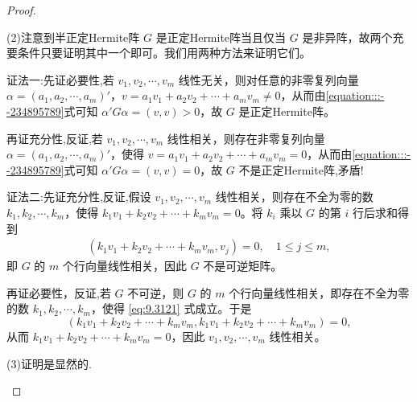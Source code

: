 \documentclass[../../main.tex]{subfiles}%
\begin{document}
\begin{proof}
\begin{enumerate}
(2)注意到半正定Hermite阵 $G$ 是正定Hermite阵当且仅当 $G$ 是非异阵，故两个充要条件只要证明其中一个即可。我们用两种方法来证明它们。

{\color{blue}证法一:}先证必要性,若 $v_1,v_2,\cdots,v_m$ 线性无关，则对任意的非零复列向量 $\alpha=(a_1,a_2,\cdots,a_m)'$，$v = a_1v_1 + a_2v_2 + \cdots + a_mv_m\neq0$，从而由\eqref{equation:::--234895789}式可知 $\alpha'G\alpha=(v,v)>0$，故 $G$ 是正定Hermite阵。

再证充分性,反证,若 $v_1,v_2,\cdots,v_m$ 线性相关，则存在非零复列向量 $\alpha=(a_1,a_2,\cdots,a_m)'$，使得 $v = a_1v_1 + a_2v_2 + \cdots + a_mv_m = 0$，从而由\eqref{equation:::--234895789}式可知 $\alpha'G\alpha=(v,v)=0$，故 $G$ 不是正定Hermite阵,矛盾!

{\color{blue}证法二:}先证充分性,反证,假设 $v_1,v_2,\cdots,v_m$ 线性相关，则存在不全为零的数 $k_1,k_2,\cdots,k_m$，使得 $k_1v_1 + k_2v_2 + \cdots + k_mv_m = 0$。将 $k_i$ 乘以 $G$ 的第 $i$ 行后求和得到
\begin{align}
(k_1v_1 + k_2v_2 + \cdots + k_mv_m,v_j)=0,\quad 1\leqslant  j\leqslant  m,\label{eq:9.3121}
\end{align}
即 $G$ 的 $m$ 个行向量线性相关，因此 $G$ 不是可逆矩阵。

再证必要性，反证,若 $G$ 不可逆，则 $G$ 的 $m$ 个行向量线性相关，即存在不全为零的数 $k_1,k_2,\cdots,k_m$，使得 \eqref{eq:9.3121} 式成立。于是
\[
(k_1v_1 + k_2v_2 + \cdots + k_mv_m,k_1v_1 + k_2v_2 + \cdots + k_mv_m)=0,
\]
从而 $k_1v_1 + k_2v_2 + \cdots + k_mv_m = 0$，因此 $v_1,v_2,\cdots,v_m$ 线性相关。

(3)证明是显然的.
\end{enumerate}

\end{proof}
\end{document}
